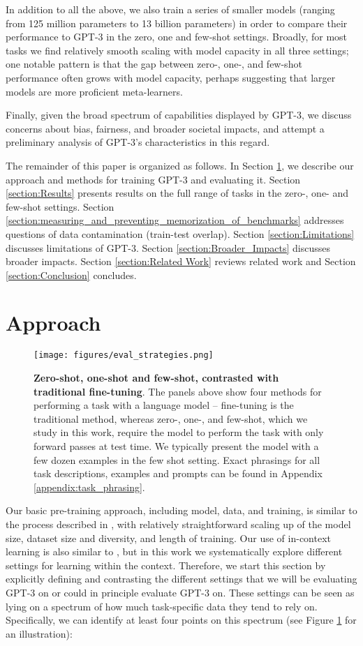 \documentclass{article}
\begin{document}
In addition to all the above, we also train a series of smaller models (ranging from 125 million parameters to 13 billion parameters) in order to compare their performance to GPT-3 in the zero, one and few-shot settings.  Broadly, for most tasks we find relatively smooth scaling with model capacity in all three settings; one notable pattern is that the gap between zero-, one-, and few-shot performance often grows with model capacity, perhaps suggesting that larger models are more proficient meta-learners.

Finally, given the broad spectrum of capabilities displayed by GPT-3, we discuss concerns about bias, fairness, and broader societal impacts, and attempt a preliminary analysis of GPT-3's characteristics in this regard.

The remainder of this paper is organized as follows.  In Section \ref{section:Approach}, we describe our approach and methods for training GPT-3 and evaluating it.  Section \ref{section:Results} presents results on the full range of tasks in the zero-, one- and few-shot settings.  Section \ref{section:measuring_and_preventing_memorization_of_benchmarks} addresses questions of data contamination (train-test overlap).  Section \ref{section:Limitations} discusses limitations of GPT-3.  Section \ref{section:Broader_Impacts} discusses broader impacts.  Section \ref{section:Related Work} reviews related work and Section \ref{section:Conclusion} concludes.

 
\section{Approach}
\label{section:Approach}
\begin{figure}
\centering\texttt{[image: figures/eval\_strategies.png]}
\caption{\textbf{Zero-shot, one-shot and few-shot, contrasted with traditional fine-tuning}. The panels above show four methods for performing a task with a language model -- fine-tuning is the traditional method, whereas zero-, one-, and few-shot, which we study in this work, require the model to perform the task with only forward passes at test time. We typically present the model with a few dozen examples in the few shot setting. Exact phrasings for all task descriptions, examples and prompts can be found in Appendix \ref{appendix:task_phrasing}.
}
\label{figure:eval strategies}
\end{figure} 
Our basic pre-training approach, including model, data, and training, is similar to the process described in \cite{radford2019language}, with relatively straightforward scaling up of the model size, dataset size and diversity, and length of training.  Our use of in-context learning is also similar to \cite{radford2019language}, but in this work we systematically explore different settings for learning within the context.  Therefore, we start this section by explicitly defining and contrasting the different settings that we will be evaluating GPT-3 on or could in principle evaluate GPT-3 on. These settings can be seen as lying on a spectrum of how much task-specific data they tend to rely on.  Specifically, we can identify at least four points on this spectrum (see Figure \ref{figure:eval strategies} for an illustration):
\end{document}
